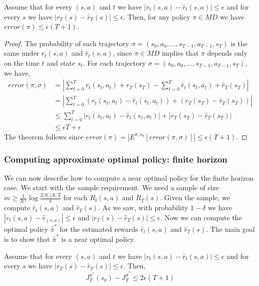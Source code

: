 \begin{theorem}
Assume that for every $(s,a)$ and $t$ we have
$|r_t(s,a)-\widehat{r}_t(s,a)|\leq \epsilon$ and for every $s$ we have
$|r_T(s)-\widehat{r}_T(s)|\leq \epsilon$. Then, for any policy $\pi\in
MD$ we have $error(\pi)\leq \epsilon(T+1)$.
\end{theorem}

\begin{proof}
The probability of each trajectory $\sigma=(s_0,a_0,\ldots, s_{T-1},a_{T-1},s_T)$ is the same under $r_t(s,a)$ and
$\widehat{r}_t(s,a)$, since $\pi\in MD$ implies that $\pi$ depends only
on the time $t$ and state $s_t$. For each trajectory $\sigma=(s_0,a_0,\ldots, s_{T-1},a_{T-1},s_T)$, we have,
\begin{align*}
error(\pi,\sigma) &= |\sum_{t=0}^T r_t(s_t,a_t)+r_T(s_T) -\sum_{t=0}^T
\widehat{r}_t(s_t,a_t)+\widehat{r}_T(s_T)| \\
&= |\sum_{t=0}^T (r_t(s_t,a_t)-\widehat{r}_t(s_t,a_t)) +
(r_T(s_T)-\widehat{r}_T(s_T))|\\
&\leq \sum_{t=0}^T |r_t(s_t,a_t)-\widehat{r}_t(s_t,a_t)| +
|r_T(s_T)-\widehat{r}_T(s_T)|\\
&\leq \epsilon T+\epsilon
\end{align*}
The theorem follows since $error(\pi)=|E^{\pi,s_0}[error(\pi,\sigma)]|\leq \epsilon(T+1)$.
\end{proof}

\subsubsection{Computing approximate optimal policy: finite horizon}

We can now describe how to compute a near optimal policy for the
finite horizon case. We start with the sample requirement. We need a
sample of size $m\geq \frac{1}{2\epsilon^2}\log \frac{2|S|\;|A|\;
T}{\delta}$ for each $R_t(s,a)$ and $R_T(s)$. Given the sample, we
compute $\widehat{r}_t(s,a)$ and $\widehat{r}_T(s)$. As we saw, with
probability $1-\delta$ we have $|r_t(s,a)-\widehat{r}_(s,a)|\leq
\epsilon$ and $|r_T(s)-\widehat{r}_T(s)|\leq\epsilon$. Now we can
compute the optimal policy $\widehat{\pi}^*$ for the estimated rewards
$\widehat{r}_t(s,a)$ and $\widehat{r}_T(s)$. The main goal is to show that
$\widehat{\pi}^*$ is a near optimal policy.

\begin{claim}
Assume that for every $(s,a)$ and $t$ we have
$|r_t(s,a)-\widehat{r}_t(s,a)|\leq \epsilon$ and for every $s$ we have
$|r_T(s)-\widehat{r}_T(s)|\leq\epsilon$. Then,
\[
J^{\pi^*}_T(s_0) - J^{\widehat{\pi}^*}_T \leq 2\epsilon(T+1)
\]
\end{claim}

